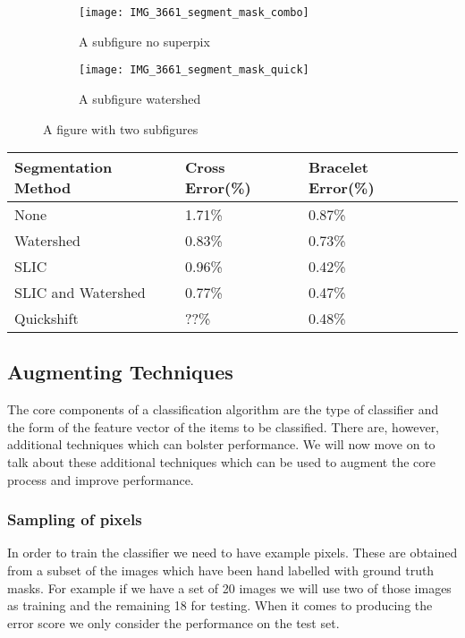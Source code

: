 \documentclass[12pt]{IIBproject}
\begin{document}
\begin{figure}[H]
\centering
\begin{subfigure}{.5\textwidth}
  \centering
  \texttt{[image: IMG\_3661\_segment\_mask\_combo]}
  \caption{A subfigure no superpix}
  \label{fig:sub2}
\end{subfigure}
\begin{subfigure}{.5\textwidth}
  \centering
  \texttt{[image: IMG\_3661\_segment\_mask\_quick]}
  \caption{A subfigure watershed}
  \label{fig:sub1}
\end{subfigure}%


\caption{A figure with two subfigures}
\label{fig:test}
\end{figure}









\begin{center}
    \begin{tabular}{ | l | l | l | p{5cm} |}
    \hline
    Segmentation Method & Cross Error(\%) & Bracelet Error(\%) \\ \hline
    None & 1.71\% & 0.87\% \\ \hline
    Watershed & 0.83\% & 0.73\% \\ \hline
    SLIC & 0.96\% & 0.42\% \\ \hline
    SLIC and Watershed & 0.77\% & 0.47\% \\ \hline
    Quickshift & ??\% & 0.48\% \\
    \hline
     
    \end{tabular}
    
\end{center}
\subsection{Augmenting Techniques}
The core components of a classification algorithm are the type of classifier and the form of the feature vector of the items to be classified. There are, however, additional techniques which can bolster performance. We will now move on to talk about these additional techniques which can be used to augment the core process and improve performance.

\subsubsection{Sampling of pixels}
In order to train the classifier we need to have example pixels. These are obtained from a subset of the images which have been hand labelled with ground truth masks. For example if we have a set of 20 images we will use two of those images as training and the remaining 18 for testing. When it comes to producing the error score we only consider the performance on the test set. 
\end{document}
